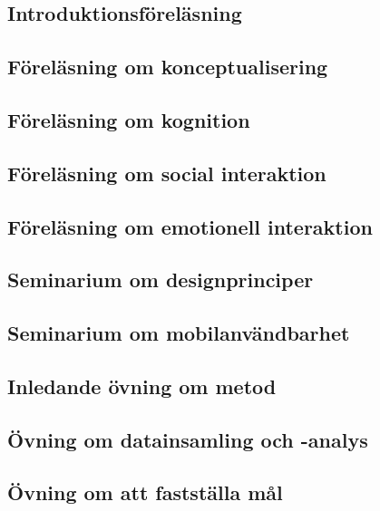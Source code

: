 \documentclass[a4paper,logo]{miunart}
\begin{document}
\subsection{Introduktionsföreläsning}


\subsection{Föreläsning om konceptualisering}


\subsection{Föreläsning om kognition}


\subsection{Föreläsning om social interaktion}


\subsection{Föreläsning om emotionell interaktion}


\subsection{Seminarium om designprinciper}


\subsection{Seminarium om mobilanvändbarhet}


\subsection{Inledande övning om metod}


\subsection{Övning om datainsamling och -analys}


\subsection{Övning om att fastställa mål}

\end{document}
